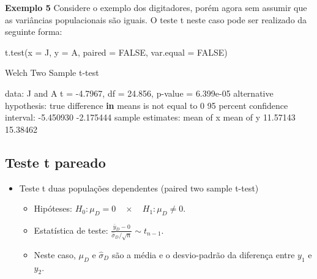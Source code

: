 \documentclass[
  10pt,
  a4paper]{book}
\newenvironment{Shaded}{\begin{snugshade}}{\end{snugshade}}
\newcommand{\AttributeTok}[1]{\textcolor[rgb]{0.77,0.63,0.00}{#1}}
\newcommand{\ConstantTok}[1]{\textcolor[rgb]{0.00,0.00,0.00}{#1}}
\newcommand{\ControlFlowTok}[1]{\textcolor[rgb]{0.13,0.29,0.53}{\textbf{#1}}}
\newcommand{\DecValTok}[1]{\textcolor[rgb]{0.00,0.00,0.81}{#1}}
\newcommand{\FloatTok}[1]{\textcolor[rgb]{0.00,0.00,0.81}{#1}}
\newcommand{\FunctionTok}[1]{\textcolor[rgb]{0.00,0.00,0.00}{#1}}
\newcommand{\NormalTok}[1]{#1}
\newcommand{\OtherTok}[1]{\textcolor[rgb]{0.56,0.35,0.01}{#1}}
\newcommand{\SpecialCharTok}[1]{\textcolor[rgb]{0.00,0.00,0.00}{#1}}
\providecommand{\tightlist}{%
  \setlength{\itemsep}{0pt}\setlength{\parskip}{0pt}}
\begin{document}
\textbf{Exemplo 5} Considere o exemplo dos digitadores, porém agora sem assumir que as variâncias populacionais são iguais. O teste t neste caso pode ser realizado da seguinte forma:

\begin{Shaded}
\begin{Highlighting}[]
\FunctionTok{t.test}\NormalTok{(}\AttributeTok{x =}\NormalTok{ J, }\AttributeTok{y =}\NormalTok{ A, }\AttributeTok{paired =} \ConstantTok{FALSE}\NormalTok{, }\AttributeTok{var.equal =} \ConstantTok{FALSE}\NormalTok{)}

\NormalTok{    Welch Two Sample t}\SpecialCharTok{{-}}\NormalTok{test}

\NormalTok{data}\SpecialCharTok{:}\NormalTok{  J and A}
\NormalTok{t }\OtherTok{=} \SpecialCharTok{{-}}\FloatTok{4.7967}\NormalTok{, df }\OtherTok{=} \FloatTok{24.856}\NormalTok{, p}\SpecialCharTok{{-}}\NormalTok{value }\OtherTok{=} \FloatTok{6.399e{-}05}
\NormalTok{alternative hypothesis}\SpecialCharTok{:}\NormalTok{ true difference }\ControlFlowTok{in}\NormalTok{ means is not equal to }\DecValTok{0}
\DecValTok{95}\NormalTok{ percent confidence interval}\SpecialCharTok{:}
 \SpecialCharTok{{-}}\FloatTok{5.450930} \SpecialCharTok{{-}}\FloatTok{2.175444}
\NormalTok{sample estimates}\SpecialCharTok{:}
\NormalTok{mean of x mean of y }
 \FloatTok{11.57143}  \FloatTok{15.38462} 
\end{Highlighting}
\end{Shaded}

\hypertarget{teste-t-pareado}{%
\subsection{Teste t pareado}\label{teste-t-pareado}}

\begin{itemize}
\tightlist
\item
  Teste t duas populações dependentes (paired two sample t-test)

  \begin{itemize}
  \tightlist
  \item
    Hipóteses: \(H_0: \mu_D = 0 \quad \times \quad H_1: \mu_D \neq 0.\)
  \item
    Estatística de teste: \(\frac{\bar{y}_D - 0}{\hat{\sigma}_D/\sqrt{n}} \sim t_{n-1}.\)
  \item
    Neste caso, \(\mu_D\) e \(\hat{\sigma}_D\) são a média e o desvio-padrão da diferença entre \(y_1\) e \(y_2\).
  \end{itemize}
\end{itemize}
\end{document}
